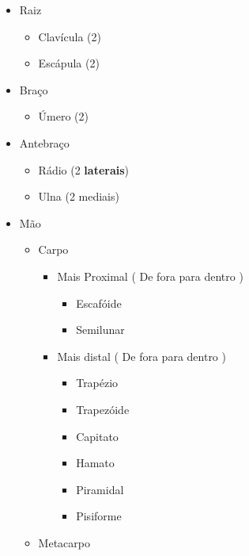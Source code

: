 \documentclass[
]{book}
\providecommand{\tightlist}{%
  \setlength{\itemsep}{0pt}\setlength{\parskip}{0pt}}
\begin{document}
\begin{itemize}
\tightlist
\item
  Raiz

  \begin{itemize}
  \tightlist
  \item
    Clavícula (2)
  \item
    Escápula (2)
  \end{itemize}
\item
  Braço

  \begin{itemize}
  \tightlist
  \item
    Úmero (2)
  \end{itemize}
\item
  Antebraço

  \begin{itemize}
  \tightlist
  \item
    Rádio (2 \textbf{laterais})
  \item
    Ulna (2 mediais)
  \end{itemize}
\item
  Mão

  \begin{itemize}
  \tightlist
  \item
    Carpo

    \begin{itemize}
    \tightlist
    \item
      Mais Proximal ( De fora para dentro )

      \begin{itemize}
      \tightlist
      \item
        Escafóide
      \item
        Semilunar
      \end{itemize}
    \item
      Mais distal ( De fora para dentro )

      \begin{itemize}
      \tightlist
      \item
        Trapézio
      \item
        Trapezóide
      \item
        Capitato
      \item
        Hamato
      \item
        Piramidal
      \item
        Pisiforme
      \end{itemize}
    \end{itemize}
  \item
    Metacarpo


\end{itemize}
\end{itemize}
\end{document}
